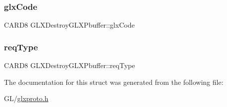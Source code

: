 \subsubsection{\texorpdfstring{glx\+Code}{glxCode}}
{\footnotesize\ttfamily C\+A\+R\+D8 G\+L\+X\+Destroy\+G\+L\+X\+Pbuffer\+::glx\+Code}

\mbox{\label{struct_g_l_x_destroy_g_l_x_pbuffer_a5920aaa695e3323fba99100509c66667}} 
\subsubsection{\texorpdfstring{req\+Type}{reqType}}
{\footnotesize\ttfamily C\+A\+R\+D8 G\+L\+X\+Destroy\+G\+L\+X\+Pbuffer\+::req\+Type}



The documentation for this struct was generated from the following file\+:\begin{DoxyCompactItemize}
\item 
G\+L/\hyperlink{glxproto_8h}{glxproto.\+h}\end{DoxyCompactItemize}
